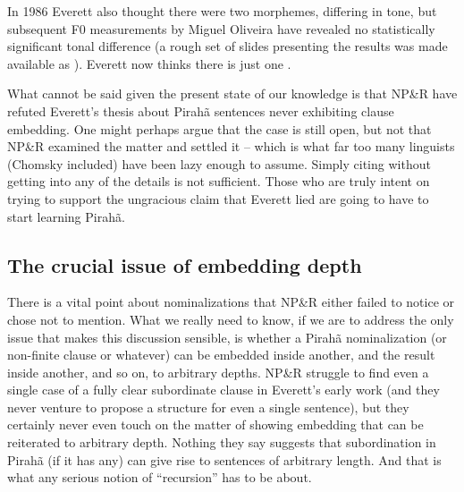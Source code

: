 \documentclass[output=paper,colorlinks,citecolor=brown
]{langscibook}
\begin{document}
In 1986 Everett also thought there were two \mbox{}
morphemes, differing in tone, but subsequent F0 measurements by Miguel
Oliveira have revealed no statistically significant tonal difference
(a rough set of slides presenting the results was made available as
\citealt{OlivEver10}). Everett now thinks there is just one
\mbox{}.

\begin{sloppypar}
What cannot be said given the present state of our knowledge is that
NP\&R have refuted Everett's thesis about Pirahã sentences never
exhibiting clause embedding. One might perhaps argue that the case
is still open, but not that NP\&R examined the matter and settled it
-- which is what far too many linguists (Chomsky included) have been
lazy enough to assume. Simply citing \citet{NevPesRod09a} without
getting into any of the details is not sufficient. Those who are truly
intent on trying to support the ungracious claim that Everett lied
are going to have to start learning Pirahã.
\end{sloppypar}

\subsection{The crucial issue of embedding depth}

There is a vital point about nominalizations that NP\&R either failed
to notice or chose not to mention. What we really need to know, if we
are to address the only issue that makes this discussion sensible, is
whether a Pirahã nominalization (or non-finite clause or whatever)
can be embedded inside another, and the result inside another, and so
on, to arbitrary depths. NP\&R struggle to find even a single case of
a fully clear subordinate clause in Everett's early work (and they
never venture to propose a structure for even a single sentence), but
they certainly never even touch on the matter of showing embedding that
can be reiterated to arbitrary depth. Nothing they say suggests that
subordination in Pirahã (if it has any) can give rise to sentences
of arbitrary length. And that is what any serious notion of ``recursion''
has to be about.
\end{document}
